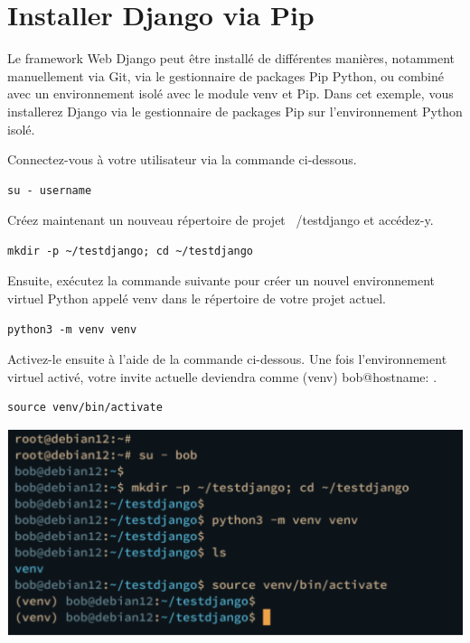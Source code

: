 \documentclass{article}
\begin{document}
\section{Installer Django via Pip}
Le framework Web Django peut être installé de différentes manières, notamment manuellement via Git, via le gestionnaire de packages Pip Python, ou combiné avec un environnement isolé avec le module venv et Pip. Dans cet exemple, vous installerez Django via le gestionnaire de packages Pip sur l'environnement Python isolé.

Connectez-vous à votre utilisateur via la commande ci-dessous.
\begin{verbatim}
su - username
\end{verbatim}
Créez maintenant un nouveau répertoire de projet ~/testdjango et accédez-y.
\begin{verbatim}
mkdir -p ~/testdjango; cd ~/testdjango
\end{verbatim}

Ensuite, exécutez la commande suivante pour créer un nouvel environnement virtuel Python appelé venv dans le répertoire de votre projet actuel.

\begin{verbatim}
python3 -m venv venv
\end{verbatim}

Activez-le ensuite à l’aide de la commande ci-dessous. Une fois l'environnement virtuel activé, votre invite actuelle deviendra comme (venv) bob@hostname: .

\begin{verbatim}
source venv/bin/activate
\end{verbatim}

\begin{center}
\includegraphics[width=15cm]{images/image05.png}
\end{center}
\end{document}
